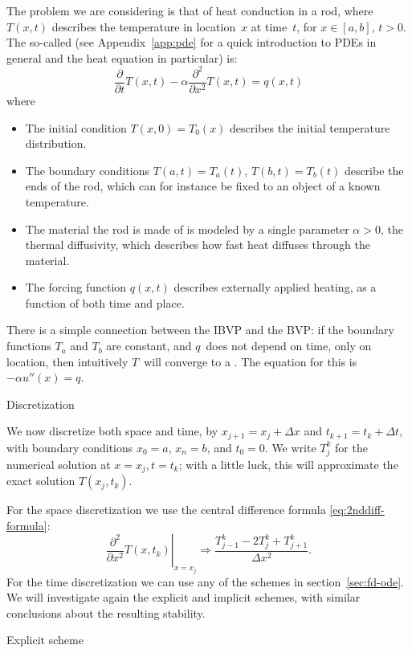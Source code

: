The problem we are considering is that of  heat conduction in a rod, where
$T(x,t)$ describes the temperature in location~$x$ at time~$t$, for
$x\in[a,b]$, $t>0$. The so-called  (see
Appendix~\ref{app:pde} for a quick introduction to \acp{PDE} in
general and the heat equation in particular) is:
\[
  \frac\partial{\partial t}T(x,t)-\alpha\frac{\partial^2}{\partial x^2}T(x,t)
  =q(x,t) 
\]
where
\begin{itemize}
\item The initial condition $T(x,0)=T_0(x)$ describes the initial
  temperature distribution.
\item The boundary conditions $T(a,t)=T_a(t)$, $T(b,t)=T_b(t)$
  describe the ends of the rod, which can for instance be fixed to an
  object of a known temperature.
\item The material the rod is made of is modeled by a single parameter
  $\alpha>0$, the thermal diffusivity, which describes how fast heat
  diffuses through the material.
\item The forcing function $q(x,t)$ describes externally applied
  heating, as a function of both time and place.
\end{itemize}
There is a simple connection between the \ac{IBVP} and the \ac{BVP}:
if the boundary functions $T_a$ and $T_b$ are constant, and $q$~does
not depend on time, only on location, then intuitively $T$~will
converge to a . 
The equation for this is $-\alpha u''(x)=q$.

\def\fr{\frac{\alpha\Delta t}{\Delta x^2}}

 {Discretization}

We now discretize both space and time, by $x_{j+1}=x_j+\Delta x$ and
$t_{k+1}=t_k+\Delta t$, with boundary conditions $x_0=a$, $x_n=b$, 
and $t_0=0$. We write $T^k_j$ for the numerical solution at $x=x_j,t=t_k$;
with a little luck, this will approximate the exact
solution $T(x_j,t_k)$.

For the space discretization we use the central difference formula
\eqref{eq:2nddiff-formula}:
\[ 
  \left.\frac{\partial^2}{\partial x^2}T(x,t_k)\right|_{x=x_j} 
  \Rightarrow
  \frac{T_{j-1}^k-2T_j^k+T_{j+1}^k}{\Delta x^2}.
\]
For the time discretization we can use any of the schemes in
section~\ref{sec:fd-ode}. We will investigate again the explicit and
implicit schemes, with similar conclusions about the
resulting stability.

 {Explicit scheme}
\label{fig:explicit-heat}

